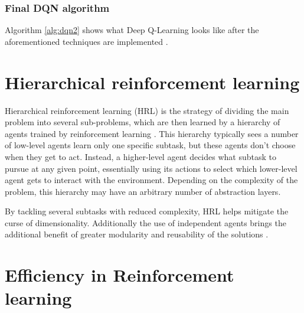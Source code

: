\subsubsection*{Final DQN algorithm}

Algorithm \ref{alg:dqn2} shows what Deep Q-Learning looks like after the aforementioned techniques are implemented \cite{Mnih:2015}.

\section{Hierarchical reinforcement learning}

Hierarchical reinforcement learning (HRL) is the strategy of dividing the main problem into several sub-problems, which are then learned by a hierarchy of agents trained by reinforcement learning \cite{Barto:2003, Al-Emran:2015, Pateria:2021}. This hierarchy typically sees a number of low-level agents learn only one specific subtask, but these agents don't choose when they get to act. Instead, a higher-level agent decides what subtask to pursue at any given point, essentially using its actions to select which lower-level agent gets to interact with the environment. Depending on the complexity of the problem, this hierarchy may have an arbitrary number of abstraction layers.

By tackling several subtasks with reduced complexity, HRL helps mitigate the curse of dimensionality. Additionally the use of independent agents brings the additional benefit of greater modularity and reusability of the solutions \cite{Al-Emran:2015}.



\section{Efficiency in Reinforcement learning}

